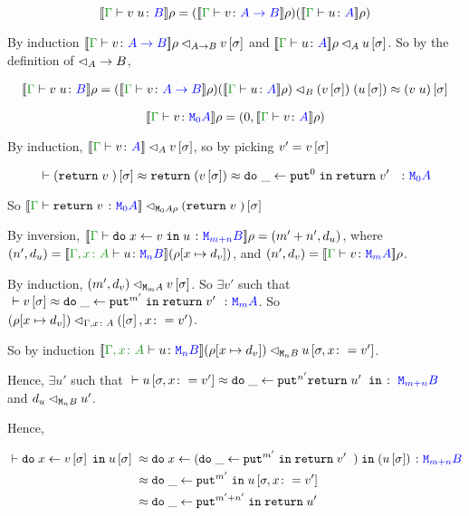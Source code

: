 \documentclass{Report}
\begin{document}
\begin{equation}
    \deno{\gtyperelation{\apply{v}{u}}{B}}\rho = (\deno{\gtyperelation{v}{\ab}}\rho)(\deno{\gtyperelation{u}{A}}\rho)
\end{equation}

By induction $\logRel{\deno{\gtyperelation{v}{\ab}}\rho}{\ab}{v\ssi}$ and $\logRel{\deno{\gtyperelation{u}{A}}\rho}{A}{u\ssi}$. So by the definition of $\lhd_A\rightarrow B$, 

\begin{align}
    \deno{\gtyperelation{\apply{v}{u}}{B}}\rho =\logRel{(\deno{\gtyperelation{v}{\ab}}\rho)(\deno{\gtyperelation{u}{A}}\rho)}{B}{\apply{(v\ssi)}{(u\ssi)}\beequiv (\apply{v}{u})\ssi}
\end{align}


\begin{equation}
    \deno{\gtyperelation{v}{\M{0}{A}}}\rho = (0, \deno{\gtyperelation{v}{A}}\rho)
\end{equation}

By induction, $\logRel{\deno{\gtyperelation{v}{A}}}{A}{v\ssi}$, so by picking $v' = v\left[\sigma\right]$

\begin{equation}
    \zberelation{(\return{v})\ssi}{\return{(v\ssi)\beequiv \doin{\_}{\put^0}{\return{v'}}}}{\M{0}{A}}
\end{equation}

So $\logRel{\deno{\gtyperelation{\return{v}}{\M{0}{A}}}}{\M{0}{A}\rho}{(\return{v})\ssi}$


By inversion, $\deno{\gtyperelation{\doin{x}{v}{u}}{\M{m+n}{B}}}\rho = (m'+n', d_u)$, where $(n', d_u) = \deno{\typerelation{\gax}{u}{\mnb}}(\rho[x\mapsto d_v])$, and $(n', d_v) = \deno{\gtyperelation{v}{\mma}}\rho$.

By induction, $(m', d_v) \lhd_{\texttt{M}_{m}{A}} v\left[\sigma\right]$. So $\exists v'$ such that $\zberelation{v\ssi}{\doin{\_}{\put^{m'}}{\return{v'}}}{\mma}$. So $(\rho[x\mapsto d_v]) \lhd_{\Gamma, x\colon A} (\left[\sigma\right], x\colon= v')$.

So by induction $\logRel{\deno{\typerelation{\gax}{u}{\mnb}}(\rho[x\mapsto d_v])}{\mnb}{u\sub{\si, x\setto v'}}$.

Hence, $\exists u'$ such that $\zberelation{u\sub{\si, x\setto v'}}{\doin{\_}{\put^{n'}{\return{u'}}}}{\M{m + n}{B}}$ and $d_u \lhd_{\texttt{M}_{n}{B}} u'$.

Hence,

\begin{align}
    \zberelation{\doin{x}{v\ssi}{u\ssi}&}{\doin{x}{(\doin{\_}{\put^{m'}}{\return{v'}})}{(u\ssi)}}{\M{m+n}{B}}\\
    &\beequiv\doin{\_}{\put^{m'}}{u\sub{\si, x\setto{v'}}}\\
    &\beequiv\doin{\_}{\put^{m'+n'}}{\return{u'}}
\end{align}
\end{document}

